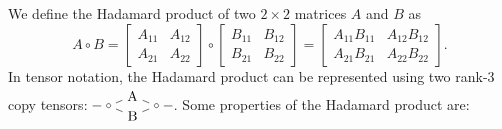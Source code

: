 We define the Hadamard product of two $2\times 2$ matrices $A$ and $B$ as
\[
   \renewcommand*{\arraystretch}{1.3}
   A \circ B = \begin{bmatrix} A_{11} & A_{12} \\ A_{21} & A_{22} \end{bmatrix} \circ
              \begin{bmatrix} B_{11} & B_{12} \\ B_{21} & B_{22} \end{bmatrix}
            = \begin{bmatrix} A_{11}B_{11} & A_{12}B_{12} \\ A_{21}B_{21} & A_{22}B_{22} \end{bmatrix}
   .
\]
In tensor notation, the Hadamard product can be represented using two rank-3 copy tensors:
$
   \begin{tikzpicture}[baseline=-.25em]
      \node (c0) at (0,0) {$\sbullet$};
      \node (A) at (.6,.25) {A};
      \node (B) at (.6,-.25) {B};
      \node (c1) at (1.2,0) {$\sbullet$};
      \draw (c0) -- (A) -- (c1);
      \draw (c0) -- (B) -- (c1);
      \draw (c0) -- ++(-.4,0);
      \draw (c1) -- ++(.4,0);
   \end{tikzpicture}
$.
Some properties of the Hadamard product are:
